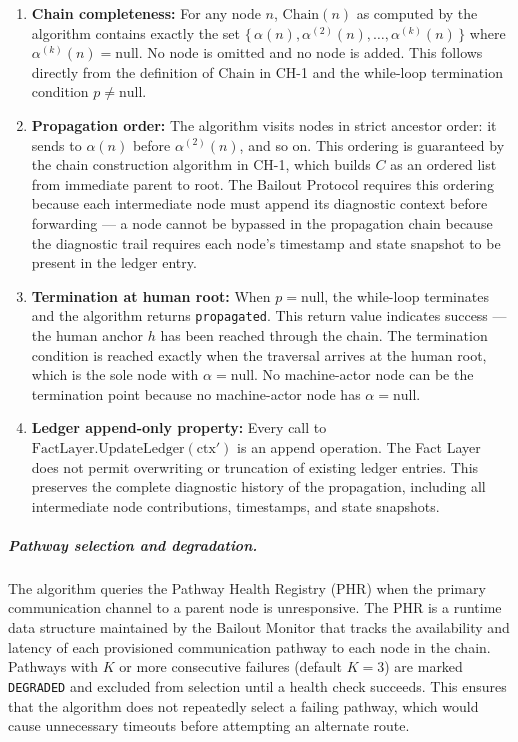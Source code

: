 \begin{enumerate}
\item[$\mathbf{I_1}$] \textbf{Chain completeness:} For any node $n$, $\text{Chain}(n)$ as computed by the algorithm contains exactly the set $\{\,\alpha(n), \alpha^{(2)}(n), \dots, \alpha^{(k)}(n)\,\}$ where $\alpha^{(k)}(n) = \text{null}$. No node is omitted and no node is added. This follows directly from the definition of $\text{Chain}$ in CH-1 and the while-loop termination condition $p \neq \text{null}$.

\item[$\mathbf{I_2}$] \textbf{Propagation order:} The algorithm visits nodes in strict ancestor order: it sends to $\alpha(n)$ before $\alpha^{(2)}(n)$, and so on. This ordering is guaranteed by the chain construction algorithm in CH-1, which builds $C$ as an ordered list from immediate parent to root. The Bailout Protocol requires this ordering because each intermediate node must append its diagnostic context before forwarding — a node cannot be bypassed in the propagation chain because the diagnostic trail requires each node's timestamp and state snapshot to be present in the ledger entry.

\item[$\mathbf{I_3}$] \textbf{Termination at human root:} When $p = \text{null}$, the while-loop terminates and the algorithm returns \texttt{propagated}. This return value indicates success — the human anchor $h$ has been reached through the chain. The termination condition is reached exactly when the traversal arrives at the human root, which is the sole node with $\alpha = \text{null}$. No machine-actor node can be the termination point because no machine-actor node has $\alpha = \text{null}$.

\item[$\mathbf{I_4}$] \textbf{Ledger append-only property:} Every call to $\text{FactLayer.UpdateLedger}(\text{ctx}')$ is an append operation. The Fact Layer does not permit overwriting or truncation of existing ledger entries. This preserves the complete diagnostic history of the propagation, including all intermediate node contributions, timestamps, and state snapshots.
\end{enumerate}

\subparagraph{Pathway selection and degradation.} The algorithm queries the Pathway Health Registry (PHR) when the primary communication channel to a parent node is unresponsive. The PHR is a runtime data structure maintained by the Bailout Monitor that tracks the availability and latency of each provisioned communication pathway to each node in the chain. Pathways with $K$ or more consecutive failures (default $K = 3$) are marked \texttt{DEGRADED} and excluded from selection until a health check succeeds. This ensures that the algorithm does not repeatedly select a failing pathway, which would cause unnecessary timeouts before attempting an alternate route.

